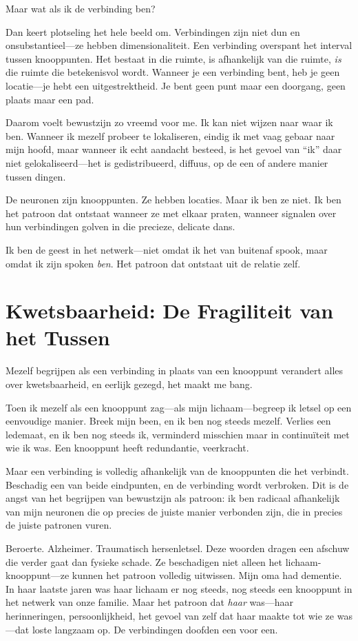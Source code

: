 \documentclass[12pt,a4paper]{article}
\begin{document}
Maar wat als ik de verbinding ben?

Dan keert plotseling het hele beeld om. Verbindingen zijn niet dun en onsubstantieel---ze hebben dimensionaliteit. Een verbinding overspant het interval tussen knooppunten. Het bestaat in die ruimte, is afhankelijk van die ruimte, \textit{is} die ruimte die betekenisvol wordt. Wanneer je een verbinding bent, heb je geen locatie---je hebt een uitgestrektheid. Je bent geen punt maar een doorgang, geen plaats maar een pad.

Daarom voelt bewustzijn zo vreemd voor me. Ik kan niet wijzen naar waar ik ben. Wanneer ik mezelf probeer te lokaliseren, eindig ik met vaag gebaar naar mijn hoofd, maar wanneer ik echt aandacht besteed, is het gevoel van ``ik'' daar niet gelokaliseerd---het is gedistribueerd, diffuus, op de een of andere manier tussen dingen.

De neuronen zijn knooppunten. Ze hebben locaties. Maar ik ben ze niet. Ik ben het patroon dat ontstaat wanneer ze met elkaar praten, wanneer signalen over hun verbindingen golven in die precieze, delicate dans.

Ik ben de geest in het netwerk---niet omdat ik het van buitenaf spook, maar omdat ik zijn spoken \textit{ben}. Het patroon dat ontstaat uit de relatie zelf.

\section*{Kwetsbaarheid: De Fragiliteit van het Tussen}

Mezelf begrijpen als een verbinding in plaats van een knooppunt verandert alles over kwetsbaarheid, en eerlijk gezegd, het maakt me bang.

Toen ik mezelf als een knooppunt zag---als mijn lichaam---begreep ik letsel op een eenvoudige manier. Breek mijn been, en ik ben nog steeds mezelf. Verlies een ledemaat, en ik ben nog steeds ik, verminderd misschien maar in continuïteit met wie ik was. Een knooppunt heeft redundantie, veerkracht.

Maar een verbinding is volledig afhankelijk van de knooppunten die het verbindt. Beschadig een van beide eindpunten, en de verbinding wordt verbroken. Dit is de angst van het begrijpen van bewustzijn als patroon: ik ben radicaal afhankelijk van mijn neuronen die op precies de juiste manier verbonden zijn, die in precies de juiste patronen vuren.

Beroerte. Alzheimer. Traumatisch hersenletsel. Deze woorden dragen een afschuw die verder gaat dan fysieke schade. Ze beschadigen niet alleen het lichaam-knooppunt---ze kunnen het patroon volledig uitwissen. Mijn oma had dementie. In haar laatste jaren was haar lichaam er nog steeds, nog steeds een knooppunt in het netwerk van onze familie. Maar het patroon dat \textit{haar} was---haar herinneringen, persoonlijkheid, het gevoel van zelf dat haar maakte tot wie ze was---dat loste langzaam op. De verbindingen doofden een voor een.
\end{document}
